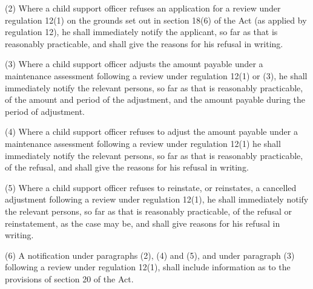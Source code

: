 \documentclass[12pt,a4paper]{article}
\begin{document}
(2) Where a child support officer refuses an application for a review under regulation 12(1) 
on the grounds set out in section 18(6) of the Act (as applied by regulation 12), he shall immediately notify the applicant, so far as that is reasonably practicable, and shall give the reasons for his refusal in writing.

(3) Where a child support officer adjusts the amount payable under a maintenance assessment following a review under regulation 12(1) 
or (3),  %
he shall immediately notify the relevant persons, so far as that is reasonably practicable, of the amount and period of the adjustment, and the amount payable during the period of adjustment.

(4) Where a child support officer refuses to adjust the amount payable under a maintenance assessment following a review under regulation 12(1) he shall immediately notify the relevant persons, so far as that is reasonably practicable, of the refusal, and shall give the reasons for his refusal in writing.


(5) Where a child support officer refuses to reinstate, or reinstates, a cancelled adjustment following a review under regulation 12(1), he shall immediately notify the relevant persons, so far as that is reasonably practicable, of the refusal or reinstatement, as the case may be, and shall give reasons for his refusal in writing.


(6) A notification under paragraphs (2), (4) and (5), and under paragraph (3) following a review under regulation 12(1), shall include information as to the provisions of section 20 of the Act.
\end{document}
